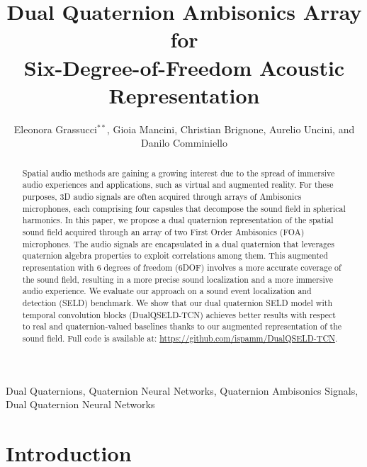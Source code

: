 \documentclass[3p, preprint, twocolumn]{elsarticle}
\begin{document}
\begin{frontmatter}

\title{Dual Quaternion Ambisonics Array for \\Six-Degree-of-Freedom Acoustic Representation}

\author{Eleonora Grassucci$^{**}$, Gioia Mancini, Christian Brignone, Aurelio Uncini, and Danilo Comminiello}
\address{Dept. of Information Engineering, Electronics and Telecommunications (DIET), Sapienza University of Rome, Italy.}


\begin{abstract}
Spatial audio methods are gaining a growing interest due to the spread of immersive audio experiences and applications, such as virtual and augmented reality. For these purposes, 3D audio signals are often acquired through arrays of Ambisonics microphones, each comprising four capsules that decompose the sound field in spherical harmonics. In this paper, we propose a dual quaternion representation of the spatial sound field acquired through an array of two First Order Ambisonics (FOA) microphones. The audio signals are encapsulated in a dual quaternion that leverages quaternion algebra properties to exploit correlations among them. This augmented representation with 6 degrees of freedom (6DOF) involves a more accurate coverage of the sound field, resulting in a more precise sound localization and a more immersive audio experience. We evaluate our approach on a sound event localization and detection (SELD) benchmark. We show that our dual quaternion SELD model with temporal convolution blocks (DualQSELD-TCN) achieves better results with respect to real and quaternion-valued baselines thanks to our augmented representation of the sound field. Full code is available at: \url{https://github.com/ispamm/DualQSELD-TCN}.
\end{abstract}

\begin{keyword}
Dual Quaternions, Quaternion Neural Networks, Quaternion Ambisonics Signals, Dual Quaternion Neural Networks
\end{keyword}

\end{frontmatter}



\section{Introduction}
\label{sec:intro}
\end{document}
